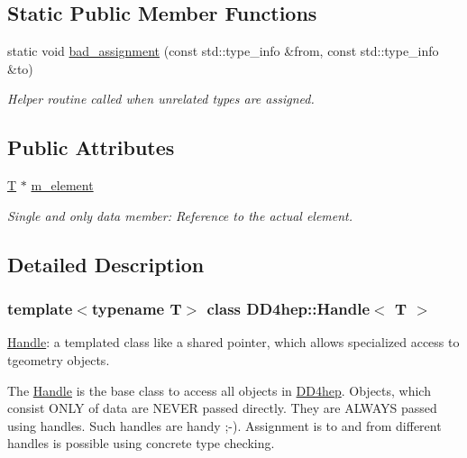 \subsection*{Static Public Member Functions}
\begin{DoxyCompactItemize}
\item 
static void \hyperlink{class_d_d4hep_1_1_handle_a7d6ad39bc68063a34d8d42ce1d9aef75}{bad\+\_\+assignment} (const std\+::type\+\_\+info \&from, const std\+::type\+\_\+info \&to)
\begin{DoxyCompactList}\small\item\em Helper routine called when unrelated types are assigned. \end{DoxyCompactList}\end{DoxyCompactItemize}
\subsection*{Public Attributes}
\begin{DoxyCompactItemize}
\item 
\hyperlink{class_t}{T} $\ast$ \hyperlink{class_d_d4hep_1_1_handle_a207411705e86b0f4053357c7a8b5532e}{m\+\_\+element}
\begin{DoxyCompactList}\small\item\em Single and only data member\+: Reference to the actual element. \end{DoxyCompactList}\end{DoxyCompactItemize}


\subsection{Detailed Description}
\subsubsection*{template$<$typename T$>$\newline
class D\+D4hep\+::\+Handle$<$ T $>$}

\hyperlink{class_d_d4hep_1_1_handle}{Handle}\+: a templated class like a shared pointer, which allows specialized access to tgeometry objects. 

The \hyperlink{class_d_d4hep_1_1_handle}{Handle} is the base class to access all objects in \hyperlink{namespace_d_d4hep}{D\+D4hep}. Objects, which consist O\+N\+LY of data are N\+E\+V\+ER passed directly. They are A\+L\+W\+A\+YS passed using handles. Such handles are \textquotesingle{}handy\textquotesingle{} ;-\/). Assignment is to and from different handles is possible using concrete type checking.

